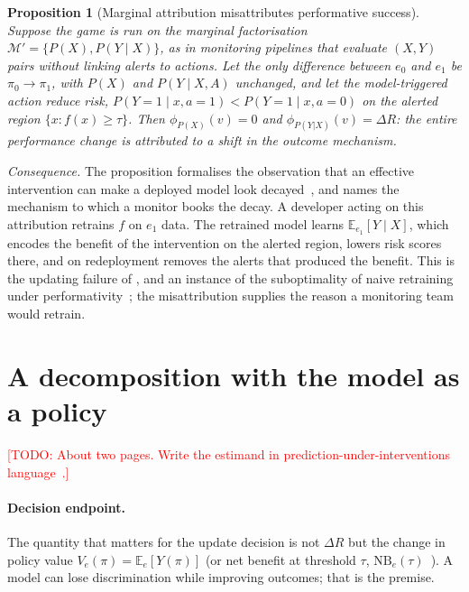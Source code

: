 \documentclass[letterpaper]{article} %
\newtheorem{proposition}{Proposition}
\newcommand{\todo}[1]{\textcolor{red}{[TODO: #1]}}
\newcommand{\E}{\mathbb{E}}
\begin{document}
\begin{proposition}[Marginal attribution misattributes performative success]
\label{prop:misattr}
Suppose the game is run on the marginal factorisation
$\mathcal{M}' = \{P(X), P(Y \mid X)\}$, as in monitoring pipelines that
evaluate $(X, Y)$ pairs without linking alerts to actions. Let the only
difference between $e_0$ and $e_1$ be
$\pi_0 \to \pi_1$, with $P(X)$ and $P(Y \mid X, A)$ unchanged, and let the
model-triggered action reduce risk, $P(Y{=}1 \mid x, a{=}1) < P(Y{=}1 \mid x,
a{=}0)$ on the alerted region $\{x : f(x) \geq \tau\}$. Then
$\phi_{P(X)}(v) = 0$ and $\phi_{P(Y|X)}(v) = \Delta R$: the entire performance
change is attributed to a shift in the outcome mechanism.
\end{proposition}

\noindent\emph{Consequence.} The proposition formalises the observation that an
effective intervention can make a deployed model look
decayed~\citep{ansari2025challenges}, and names the mechanism to which a
monitor books the decay. A developer acting on this attribution retrains
$f$ on $e_1$ data. The retrained model learns $\E_{e_1}[Y \mid X]$, which
encodes the benefit of the intervention on the alerted region, lowers risk
scores there, and on redeployment removes the alerts that produced the benefit.
This is the updating failure of \citet[Theorem~1]{liley2021model}, and an
instance of the suboptimality of naive retraining under
performativity~\citep{kabra2024limitations}; the misattribution supplies the
reason a monitoring team would retrain.

\section{A decomposition with the model as a policy}
\label{sec:estimand}

\todo{About two pages. Write the estimand in prediction-under-interventions
language~\citep{keogh2024prediction, luijken2024estimands}.}

\paragraph{Decision endpoint.} The quantity that matters for the update
decision is not $\Delta R$ but the change in policy value
$V_e(\pi) = \E_e[Y(\pi)]$ (or net benefit at threshold $\tau$,
$\mathrm{NB}_e(\tau)$~\citep{vickers2006decision}). A model can lose
discrimination while improving outcomes; that is the premise.
\end{document}
